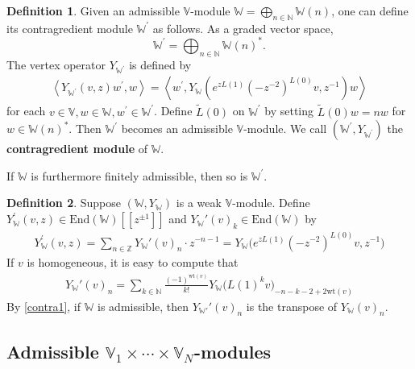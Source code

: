 \documentclass[11pt,b5paper,notitlepage]{article}
\theoremstyle{definition}
\newtheorem{df}{Definition}[section]
\theoremstyle{plain}
\newcommand{\wtd}{\widetilde}
\newcommand{\End}{\mathrm{End}} %
\newcommand{\Vbb}{\mathbb V}
\newcommand{\Wbb}{\mathbb W}
\newcommand{\Nbb}{\mathbb N}
\newcommand{\Zbb}{\mathbb Z}
\newcommand{\wt}{\mathrm{wt}}
\newcommand{\<}{\left\langle}
\renewcommand{\>}{\right\rangle}
\numberwithin{equation}{section}
\begin{document}
\begin{df}
    Given an admissible $\Vbb$-module $\Wbb=\bigoplus_{n\in \Nbb} \Wbb(n)$, one can define its contragredient module $\Wbb^\prime$ as follows. As a graded vector space,
    \begin{equation}\label{grading2}
    \Wbb^\prime=\bigoplus_{n\in \Nbb}\Wbb(n)^*.
    \end{equation}
    The vertex operator $Y_{\Wbb^\prime}$ is defined by 
    \begin{align}\label{contra1}
    \<Y_{\Wbb^\prime}(v,z)w^\prime,w\>=\<w^\prime ,Y_\Wbb(e^{zL(1)}(-z^{-2})^{L(0)}v,z^{-1})w\>
    \end{align}
    for each $v\in \Vbb,w\in \Wbb,w^\prime\in \Wbb^\prime$.    Define $\wtd{L}(0)$ on $\Wbb^{\prime}$ by setting $\wtd{L}(0)w=nw$ for $w\in \Wbb(n)^*$. Then $\Wbb^\prime$ becomes an admissible $\Vbb$-module. We call $(\Wbb^\prime,Y_{\Wbb^\prime})$ the \textbf{contragredient module} of $\Wbb$.
\end{df}
 
 If $\Wbb$ is furthermore finitely admissible, then so is $\Wbb^\prime$.

\begin{df}\label{lb59}
    Suppose $(\Wbb,Y_\Wbb)$ is a weak $\Vbb$-module. Define $Y_\Wbb^\prime(v,z)\in\End(\Wbb)[[z^{\pm1}]]$ and $Y_\Wbb'(v)_k\in\End(\Wbb)$ by \index{Y@$Y_\Wbb^\prime(v,z),Y_\Wbb^\prime(v)_k$}
    \begin{gather}
        Y_\Wbb^\prime(v,z)=\sum_{n\in\Zbb}Y_\Wbb'(v)_n\cdot z^{-n-1}=Y_\Wbb\big(e^{zL(1)}(-z^{-2})^{L(0)}v,z^{-1}\big)  \label{eq138}
    \end{gather}
If $v$ is homogeneous, it is easy to compute that
\begin{align}
    Y_\Wbb'(v)_n =\sum_{k\in \Nbb} \frac{(-1)^{\wt(v)}}{k!}Y_\Wbb\big(L(1)^k v\big)_{-n-k-2+2\wt(v)}   \label{eq139}
\end{align}
By \eqref{contra1}, if $\Wbb$ is admissible, then $Y_{\Wbb'}'(v)_n$ is the transpose of $Y_\Wbb(v)_n$.
\end{df}



\subsection{Admissible $\Vbb_1\times \cdots \times \Vbb_N$-modules}
\end{document}
